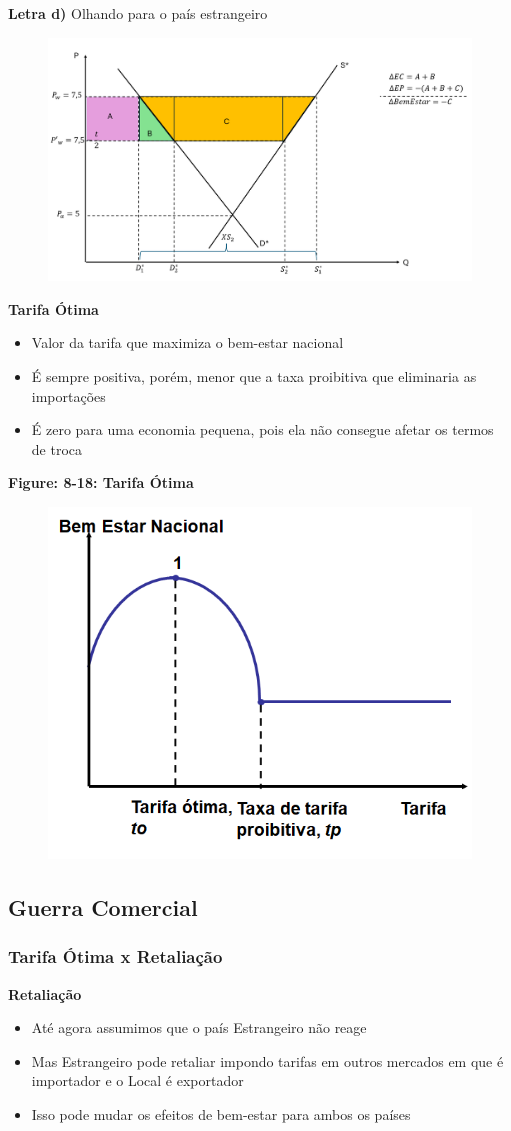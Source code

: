 \documentclass[a4paper,12pt]{article}[abntex2]
\begin{document}
\textbf{Letra d)} Olhando para o país estrangeiro

\begin{figure}[H]
    \centering
    \includegraphics[width=0.7\linewidth]{Imagens/a22i5.png}
\end{figure}

\textbf{Tarifa Ótima}\begin{itemize}
    \item Valor da tarifa que maximiza o bem-estar nacional
    \item É sempre positiva, porém, menor que a taxa proibitiva que eliminaria as importações
    \item É zero para uma economia pequena, pois ela não consegue afetar os termos de troca
\end{itemize}

\textbf{Figure: 8-18: Tarifa Ótima}
\begin{figure}[H]
    \centering
    \includegraphics[width=0.7\linewidth]{Imagens/a22i1.png}
\end{figure}

\subsection{\textbf{Guerra Comercial}}
\subsubsection{\textbf{Tarifa Ótima x Retaliação}}
\textbf{Retaliação}\begin{itemize}
    \item  Até agora assumimos que o país Estrangeiro não reage
    \item  Mas Estrangeiro pode retaliar impondo tarifas em outros mercados em que é importador e o Local é exportador
    \item  Isso pode mudar os efeitos de bem-estar para ambos os países
\end{itemize}
\end{document}

